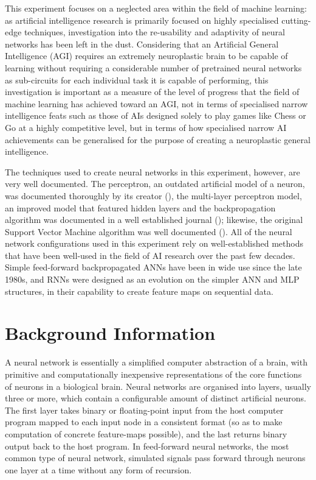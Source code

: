 \documentclass[]{report}
\begin{document}
This experiment focuses on a neglected area within the field of machine learning: as artificial intelligence research is primarily focused on highly specialised cutting-edge techniques, investigation into the re-usability and adaptivity of neural networks has been left in the dust. Considering that an Artificial General Intelligence (AGI) requires an extremely neuroplastic brain to be capable of learning without requiring a considerable number of pretrained neural networks as sub-circuits for each individual task it is capable of performing, this investigation is important as a measure of the level of progress that the field of machine learning has achieved toward an AGI, not in terms of specialised narrow intelligence feats such as those of AIs designed solely to play games like Chess or Go at a highly competitive level, but in terms of how specialised narrow AI achievements can be generalised for the purpose of creating a neuroplastic general intelligence.

The techniques used to create neural networks in this experiment, however, are very well documented. The perceptron, an outdated artificial model of a neuron, was documented thoroughly by its creator (\cite{rosenblatt1958perceptron}), the multi-layer perceptron model, an improved model that featured hidden layers and the backpropagation algorithm was documented in a well established journal (\cite{rumelhart1986learning}); likewise, the original Support Vector Machine algorithm was well documented (\cite{vapnik1995support}). All of the neural network configurations used in this experiment rely on well-established methods that have been well-used in the field of AI research over the past few decades. Simple feed-forward backpropagated ANNs have been in wide use since the late 1980s, and RNNs were designed as an evolution on the simpler ANN and MLP structures, in their capability to create feature maps on sequential data.

\section{Background Information}

A neural network is essentially a simplified computer abstraction of a brain, with primitive and computationally inexpensive representations of the core functions of neurons in a biological brain. Neural networks are organised into layers, usually three or more, which contain a configurable amount of distinct artificial neurons. The first layer takes binary or floating-point input from the host computer program mapped to each input node in a consistent format (so as to make computation of concrete feature-maps possible), and the last returns binary output back to the host program. In feed-forward neural networks, the most common type of neural network, simulated signals pass forward through neurons one layer at a time without any form of recursion.
\end{document}

